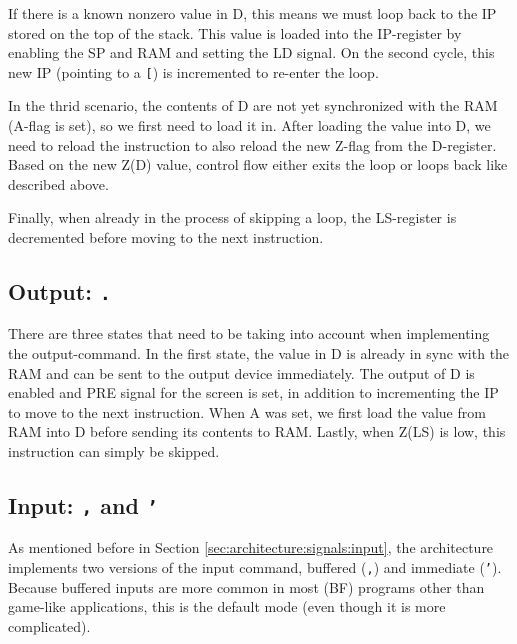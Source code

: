 If there is a known nonzero value in D, this means we must loop back to the IP stored on the top of the stack. This value is loaded into the IP-register by enabling the SP and RAM and setting the LD signal. On the second cycle, this new IP (pointing to a \texttt{[}) is incremented to re-enter the loop.

In the thrid scenario, the contents of D are not yet synchronized with the RAM (A-flag is set), so we first need to load it in. After loading the value into D, we need to reload the instruction to also reload the new Z-flag from the D-register. Based on the new Z(D) value, control flow either exits the loop or loops back like described above.

Finally, when already in the process of skipping a loop, the LS-register is decremented before moving to the next instruction.

\subsection{Output: \texttt{.}}
There are three states that need to be taking into account when implementing the output-command. In the first state, the value in D is already in sync with the RAM and can be sent to the output device immediately. The output of D is enabled and PRE signal for the screen is set, in addition to incrementing the IP to move to the next instruction. When A was set, we first load the value from RAM into D before sending its contents to RAM. Lastly, when Z(LS) is low, this instruction can simply be skipped.

\subsection{Input: \texttt{,} and \texttt{'}}
As mentioned before in Section \ref{sec:architecture:signals:input}, the architecture implements two versions of the input command, buffered (\texttt{,}) and immediate (\texttt{'}). Because buffered inputs are more common in most (BF) programs other than game-like applications, this is the default mode (even though it is more complicated).

